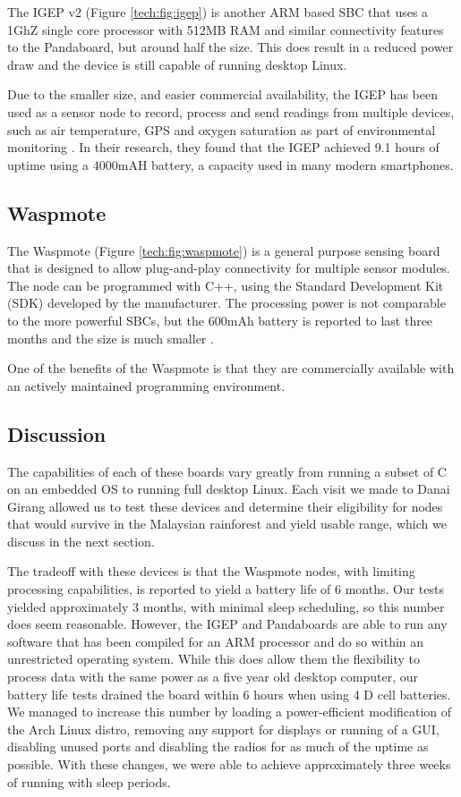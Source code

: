 The IGEP v2 (Figure \ref{tech:fig:igep}) is another ARM based SBC that uses a 1GhZ single core processor with 512MB RAM and similar connectivity features to the Pandaboard, but around half the size. This does result in a reduced power draw and the device is still capable of running desktop Linux.

Due to the smaller size, and easier commercial availability, the IGEP has been used as a sensor node to record, process and send readings from multiple devices, such as air temperature, GPS and oxygen saturation as part of environmental monitoring \cite{Resch}. In their research, they found that the IGEP achieved 9.1 hours of uptime using a 4000mAH battery, a capacity used in many modern smartphones.

\subsection{Waspmote}
The Waspmote (Figure \ref{tech:fig:waspmote}) is a general purpose sensing board that is designed to allow plug-and-play connectivity for multiple sensor modules. The node can be programmed with C++, using the Standard Development Kit (SDK) developed by the manufacturer. The processing power is not comparable to the more powerful SBCs, but the 600mAh battery is reported to last three months and the size is much smaller \cite{waspmote}.

One of the benefits of the Waspmote is that they are commercially available with an actively maintained programming environment.

\subsection{Discussion} \label{tech:hw:conc}
The capabilities of each of these boards vary greatly from running a subset of C on an embedded OS to running full desktop Linux. Each visit we made to Danai Girang allowed us to test these devices and determine their eligibility for nodes that would survive in the Malaysian rainforest and yield usable range, which we discuss in the next section.

The tradeoff with these devices is that the Waspmote nodes, with limiting processing capabilities, is reported to yield a battery life of 6 months. Our tests yielded approximately 3 months, with minimal sleep scheduling, so this number does seem reasonable. However, the IGEP and Pandaboards are able to run any software that has been compiled for an ARM processor and do so within an unrestricted operating system. While this does allow them the flexibility to process data with the same power as a five year old desktop computer, our battery life tests drained the board within 6 hours when using 4 D cell batteries. We managed to increase this number by loading a power-efficient modification of the Arch Linux distro, removing any support for displays or running of a GUI, disabling unused ports and disabling the radios for as much of the uptime as possible. With these changes, we were able to achieve approximately three weeks of running with sleep periods.

